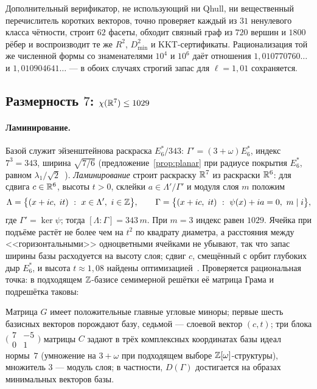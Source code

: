 Дополнительный верификатор, не использующий ни Qhull, ни вещественный
перечислитель коротких векторов, точно проверяет каждый из $31$ ненулевого
класса чётности, строит $62$ фасеты, обходит связный граф из $720$ вершин и
$1800$ рёбер и воспроизводит те же $R^2$, $D_{\min}^2$ и KKT-сертификаты.
Рационализация той же численной формы со знаменателями $10^4$ и $10^6$ даёт
отношения $1{,}010770760\ldots$ и $1{,}010904641\ldots$ --- в обоих случаях
строгий запас для $\ell=1{,}01$ сохраняется.

\subsection{Размерность $7$: $\chi(\mathbb{R}^7)\le1029$}\label{ssec:dim7}

\paragraph{Ламинирование.}
Базой служит эйзенштейнова раскраска $E_6^*/343$: $\Gamma'=(3+\omega)E_6^*$,
индекс $7^3=343$, ширина $\sqrt{7/6}$ (предложение~\ref{prop:planar} при
радиусе покрытия $E_6^*$, равном $\lambda_1/\sqrt2$~\cite{ConwaySloane}).
\emph{Ламинирование} строит раскраску $\mathbb{R}^7$ из раскраски $\mathbb{R}^6$: для
сдвига $c\in\mathbb{R}^6$, высоты $t>0$, склейки $a\in\Lambda'/\Gamma'$ и модуля
слоя $m$ положим
\[
\Lambda=\bigl\{(x+ic,\;it)\ :\ x\in\Lambda',\ i\in\Z\bigr\},\qquad
\Gamma=\bigl\{(x+ic,\;it)\ :\ \psi(x)+ia=0,\ m\mid i\bigr\},
\]
где $\Gamma'=\ker\psi$; тогда $[\Lambda:\Gamma]=343\,m$. При $m=3$ индекс
равен $1029$. Ячейка при подъёме растёт не более чем на $t^2$ по квадрату
диаметра, а расстояния между <<горизонтальными>> одноцветными ячейками не
убывают, так что запас ширины базы расходуется на высоту слоя; сдвиг $c$,
смещённый с орбит глубоких дыр $E_6^*$, и высота $t\approx1{,}08$ найдены
оптимизацией~\cite{Repo}. Проверяется рациональная точка: в
подходящем $\mathbb{Z}$-базисе семимерной решётки её матрица Грама и подрешётка
таковы:

Матрица $G$ имеет положительные главные угловые миноры; первые шесть базисных
векторов порождают базу, седьмой --- слоевой вектор $(c,t)$; три блока
$\bigl(\begin{smallmatrix}7&-5\\0&1\end{smallmatrix}\bigr)$ матрицы $C$
задают в трёх комплексных координатах базы идеал нормы~$7$ (умножение на
$3+\omega$ при подходящем выборе $\mathbb{Z}[\omega]$-структуры), множитель $3$ ---
модуль слоя; в частности, $D(\Gamma)$ достигается на образах минимальных
векторов базы.

